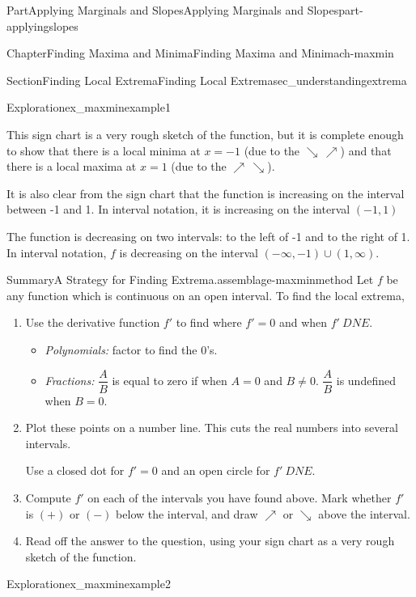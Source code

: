 \documentclass{tufte-book}
\numberwithin{equation}{chapter}
\begin{document}
\begin{partptx}{Part}{Applying Marginals and Slopes}{}{Applying Marginals and Slopes}{}{}{part-applyingslopes}
\begin{chapterptx}{Chapter}{Finding Maxima and Minima}{}{Finding Maxima and Minima}{}{}{ch-maxmin}
\begin{sectionptx}{Section}{Finding Local Extrema}{}{Finding Local Extrema}{}{}{sec_understandingextrema}
\begin{exploration}{Exploration}{}{ex_maxminexample1}
\begin{enumerate}[font=\bfseries,label=(\alph*),ref=\alph*]
\begin{image}{0.25}{0.5}{0.25}{}
{\begin{tikzpicture}
\end{tikzpicture}
}%
\end{image}%
%
\par
This sign chart is a very rough sketch of the function, but it is complete enough to show that there is a local minima at \(x=-1\) (due to the \(\searrow\,\nearrow\)) and that there is a local maxima at \(x=1\) (due to the \(\nearrow\,\searrow\)).%
\par
It is also clear from the sign chart that the function is increasing on the interval between -1 and 1.  In interval notation, it is increasing on the interval \((-1,1)\)%
\par
The function is decreasing on two intervals: to the left of -1 and to the right of 1.  In interval notation, \(f\) is decreasing on the interval \((-\infty, -1)\cup (1,\infty)\).%
\end{enumerate}%
\end{exploration}%
\begin{assemblage}{Summary}{A Strategy for Finding Extrema.}{assemblage-maxminmethod}%
Let \(f\) be any function which is continuous on an open interval. To find the local extrema,%
\begin{enumerate}
\item{}Use the derivative function \(f'\) to find where \(f'=0\) and when \(f'\ DNE\).%
\begin{itemize}[label=\textbullet]
\item{}\emph{Polynomials:} factor to find the 0's.%
\item{}\emph{Fractions:} \(\dfrac{A}{B}\) is equal to zero if when \(A=0\) and \(B\neq 0\). \(\dfrac{A}{B}\) is undefined when \(B=0\).%
\end{itemize}
%
\item{}Plot these points on a number line. This cuts the real numbers into several intervals.%
\par
Use a closed dot for \(f'=0\) and an open circle for \(f'\ DNE\).%
\item{}Compute \(f'\) on each of the intervals you have found above. Mark whether \(f'\) is \((+)\) or \((-)\) below the interval, and draw \(\nearrow\) or \(\searrow\) above the interval.%
\item{}Read off the answer to the question, using your sign chart as a very rough sketch of the function.%
\end{enumerate}
%
\end{assemblage}
\begin{exploration}{Exploration}{}{ex_maxminexample2}%

\end{exploration}
\end{sectionptx}
\end{chapterptx}
\end{partptx}
\end{document}
